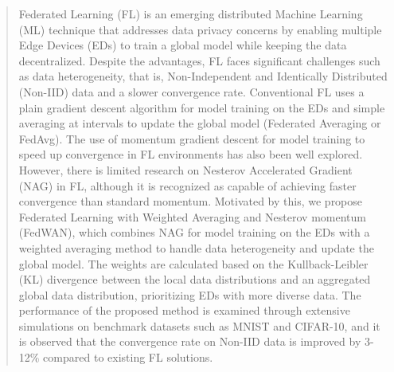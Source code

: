 \documentclass[journal]{IEEEtran}
\begin{document}
\begin{abstract}
Federated Learning (FL) is an emerging distributed Machine Learning (ML) technique that addresses data privacy concerns by enabling multiple Edge Devices (EDs) to train a global model while keeping the data decentralized. Despite the advantages, FL faces significant challenges such as data heterogeneity, that is, Non-Independent and Identically Distributed (Non-IID) data and a slower convergence rate. Conventional FL uses a plain gradient descent algorithm for model training on the EDs and simple averaging at intervals to update the global model (Federated Averaging or FedAvg). The use of momentum gradient descent for model training to speed up convergence in FL environments has also been well explored. However, there is limited research on Nesterov Accelerated Gradient (NAG) in FL, although it is recognized as capable of achieving faster convergence than standard momentum. Motivated by this, we propose Federated Learning with Weighted Averaging and Nesterov momentum (FedWAN), which combines NAG for model training on the EDs with a weighted averaging method to handle data heterogeneity and update the global model. The weights are calculated based on the Kullback-Leibler (KL) divergence between the local data distributions and an aggregated global data distribution, prioritizing EDs with more diverse data. The performance of the proposed method is examined through extensive simulations on benchmark datasets such as MNIST and CIFAR-10, and it is observed that the convergence rate on Non-IID data is improved by 3-12\% compared to existing FL solutions.

\end{abstract}
\end{document}
